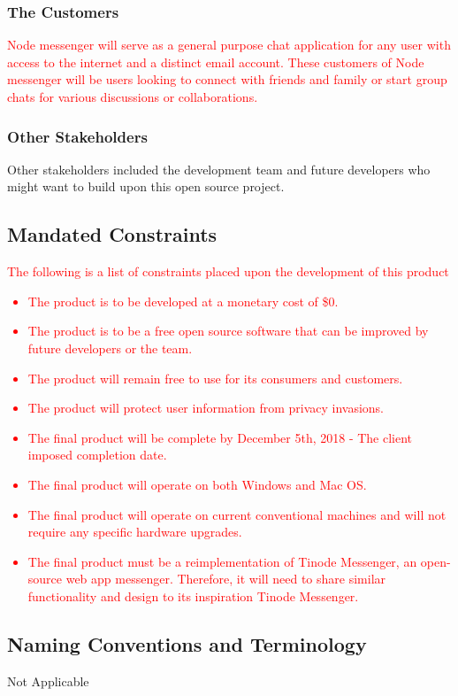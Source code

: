 \documentclass[12pt, titlepage]{article}
\begin{document}
    		\subsubsection{The Customers}
    		\textcolor{red}{Node messenger will serve as a general purpose chat application for any user with access to the internet and a distinct email account. These customers of Node messenger will be users looking to connect with friends and family or start group chats for various discussions or collaborations.}
    		\subsubsection{Other Stakeholders}
    		 Other stakeholders included the development team and future developers who might want to build upon this open source project.

    	\subsection{Mandated Constraints}
    \textcolor{red}{The following is a list of constraints placed upon the development of this product
    \begin{itemize}
    		\item The product is to be developed at a monetary cost of \$0.
    		\item The product is to be a free open source software that can be improved by future developers or the team.
    		\item The product will remain free to use for its consumers and customers.
    		\item The product will protect user information from privacy invasions.
    		\item The final product will be complete by December 5th, 2018 - The client imposed completion date.
    		\item The final product will operate on both Windows and Mac OS.
    		\item The final product will operate on current conventional machines and will not require any specific hardware upgrades.
    		\item The final product must be a reimplementation of Tinode Messenger, an open-source web app messenger. Therefore, it will need to share similar functionality and design to its inspiration Tinode Messenger.
    \end{itemize}}
    	\subsection{Naming Conventions and Terminology}
		Not Applicable
\end{document}
